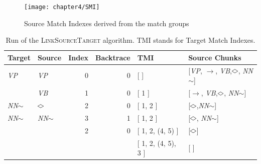\documentclass[12pt]{ociamthesis}  %
\newcommand{\anything}{\mathbin{\rotatebox[origin=c]{90}{$\lozenge$}}}
\newcommand{\nothing}{\text{\rule{1.5ex}{0.4pt}\;}}
\begin{document}
\begin{figure}[H]
\centering
\texttt{[image: chapter4/SMI]}
\caption{Source Match Indexes derived from the match groups}
\label{fig:smi}
\end{figure}

\begin{table}[ht]
\center
\small
\begin{tabular}{l l r r | l l}
Target & Source & Index & Backtrace & TMI & Source Chunks \\
\hline
\textit{VP} & \textit{VP} & 0 & 0 & [ ] & [\textit{VP}, $\rightarrow$, \textit{VB},$\anything$, \textit{NN$\sim$}] \\
\nothing & \textit{VB} & 1 & 0 & [ 1 ] & [$\rightarrow$, \textit{VB},$\anything$, \textit{NN$\sim$}] \\
\textit{NN$\sim$} & $\anything$ & 2 & 0 & [ 1, 2 ] & [$\anything$,\textit{NN$\sim$}] \\
\textit{NN$\sim$} & \textit{NN$\sim$} & 3 & 1 & [ 1, 2 ] & [$\anything$, \textit{NN$\sim$}] \\
\nothing & \nothing & 2 & 0 & [ 1, 2, (4, 5) ] & [$\anything$] \\
 &  & & & [ 1, 2, (4, 5), 3 ] & [ ] \\
\end{tabular}
\caption[Run of the \textsc{LinkSourceTarget} algorithm]{Run of the \textsc{LinkSourceTarget} algorithm. TMI stands for Target Match Indexes.}
\label{table:run}
\end{table}
\end{document}
